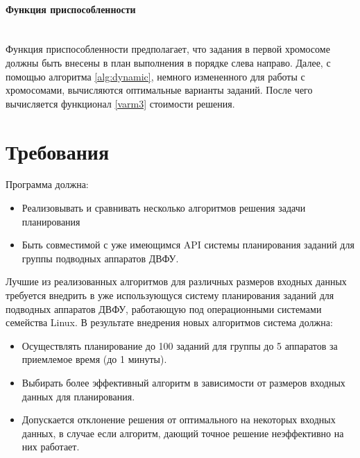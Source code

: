 \documentclass[a4paper,14pt,russian]{article}
\begin{document}
\paragraph{Функция приспособленности} ~\\
Функция приспособленности предполагает, что задания в первой хромосоме должны быть внесены в план выполнения в порядке слева направо.
Далее, с помощью алгоритма \eqref{alg:dynamic}, немного измененного для работы с хромосомами, вычисляются оптимальные варианты заданий.
После чего вычисляется функционал \eqref{varm3} стоимости решения.


\section{Требования}



Программа должна:
\begin{itemize}
\item Реализовывать и сравнивать несколько алгоритмов решения задачи планирования
\item Быть совместимой с уже имеющимся API системы планирования заданий для группы подводных аппаратов ДВФУ.
\end{itemize}

Лучшие из реализованных алгоритмов для различных размеров входных данных требуется внедрить в уже использующуся систему планирования заданий для подводных аппаратов ДВФУ, работающую под операционными системами семейства Linux. В результате внедрения новых алгоритмов система должна:
\begin{itemize}

\item Осуществлять планирование до 100 заданий для группы до 5 аппаратов за приемлемое время (до 1 минуты).
\item Выбирать более эффективный алгоритм в зависимости от размеров входных данных для планирования.
\item Допускается отклонение решения от оптимального на некоторых входных данных, в случае если алгоритм, дающий точное решение неэффективно на них работает.
\end{itemize}

\end{document}
